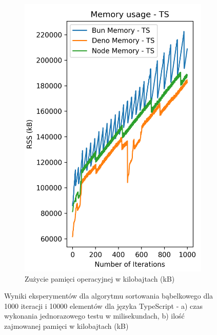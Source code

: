 \begin{figure}[H]
\begin{subfigure}[b]{0.44\textwidth}
    \label{fig:bubble_sorting_e4_ts_time}
  \end{subfigure}
  \begin{subfigure}[b]{0.44\textwidth}
    \centering
    \includegraphics[width=\textwidth]{Figures/sorting/sorting_bubble_1000_10000_ts_memory.png}
    \caption{Zużycie pamięci operacyjnej w kilobajtach (kB)}
    \label{fig:bubble_sorting_e4_ts_memory}
  \end{subfigure}
  \caption{Wyniki eksperymentów dla algorytmu sortowania bąbelkowego dla 1000 iteracji i 10000 elementów dla języka TypeScript - a) czas wykonania jednorazowego testu w milisekundach, b) ilość zajmowanej pamięci w kilobajtach (kB)}
  \label{fig:bubble_sorting_e4_ts}
\end{figure}

